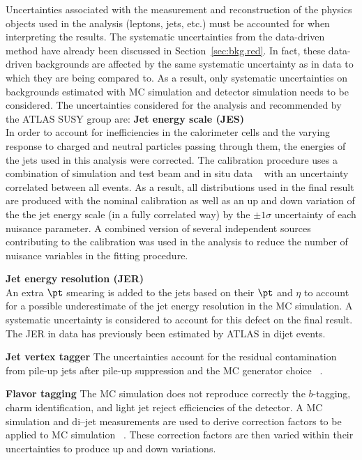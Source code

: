 Uncertainties associated with the measurement and reconstruction of the 
physics objects used in the analysis (leptons, jets, etc.) must be accounted
 for when interpreting the results.
The systematic uncertainties from the data-driven method have already been 
discussed in Section~\ref{sec:bkg.red}. In fact, these data-driven backgrounds 
are affected by the same systematic uncertainty as in data to which they 
are being compared to. As a result, only systematic uncertainties on 
backgrounds estimated with MC simulation and detector simulation needs to 
be considered. The uncertainties considered for the analysis and 
recommended by the ATLAS SUSY group are:
\textbf{Jet energy scale (JES)}  \\  
In order to account for inefficiencies in the calorimeter cells
and the varying response to charged and neutral particles passing through 
them, the energies of the jets used in this analysis were corrected. 
The calibration procedure uses a combination of simulation and test beam 
and in situ data ~\cite{Aaboud:2017jcu} with an uncertainty correlated 
between all events.
As a result, all distributions used in the final result are produced 
with the nominal calibration as well as an up and down variation of the 
the jet energy scale (in a fully correlated way) by the 
$\pm 1\sigma$ uncertainty of each nuisance parameter.
A combined version of several independent sources contributing to the 
calibration was used in the analysis 
to reduce the number of nuisance variables in the fitting procedure.


\textbf{Jet energy resolution (JER)} \\ %
An extra $\pt$ smearing is added to the jets based on their $\pt$ and $\eta$ 
to account for a possible underestimate of the jet energy resolution 
in the MC simulation. A systematic
uncertainty is considered to account for this defect on the final result. 
The JER in data has previously been estimated by ATLAS in dijet events. %


\textbf{Jet vertex tagger}
The uncertainties account for the residual contamination from pile-up jets 
after pile-up suppression and the MC generator choice
~\cite{ATLAS-CONF-2014-018}.

\textbf{Flavor tagging}
The MC simulation does not reproduce correctly the $b$-tagging, 
charm identification, and light jet reject efficiencies of the detector. 
A \ttbar MC simulation and di--jet measurements are used to derive 
correction factors to be applied to MC simulation
~\cite{ATL-PHYS-PUB-2015-022,ATL-PHYS-PUB-2016-012}.
These correction factors are then varied within
their uncertainties to produce up and down variations.


